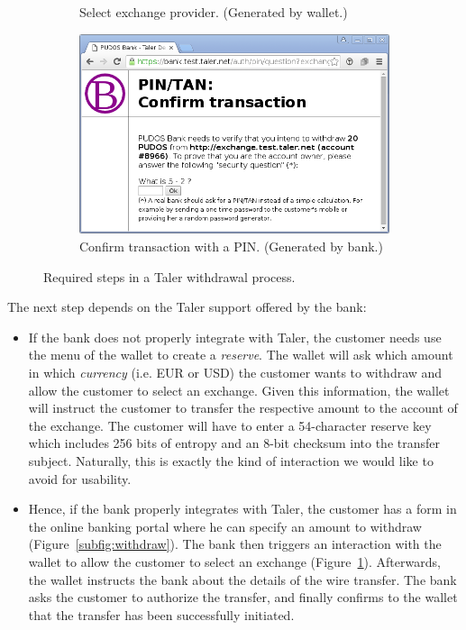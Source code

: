 \documentclass{IEEEtran}
\begin{document}
\begin{figure}
\begin{subfigure}{\linewidth}
\caption{Select exchange provider. (Generated by wallet.)}
\label{subfig:exchange}
\end{subfigure}
\begin{subfigure}{\linewidth}
\includegraphics[width=\linewidth]{figs/bank3a.png}
\caption{Confirm transaction with a PIN. (Generated by bank.)}
\label{subfig:pin}
\end{subfigure}
\caption{Required steps in a Taler withdrawal process.}
\label{fig:withdrawal}
\end{figure}


The next step depends on the Taler support offered by the bank:
\begin{itemize}
\item If the bank does not properly integrate with Taler, the
  customer needs use the menu of the wallet to create a {\em reserve}.
  The wallet will ask which amount in which {\em currency} (i.e. EUR
  or USD) the customer wants to withdraw and allow the customer to
  select an exchange.  Given this information, the wallet will
  instruct the customer to transfer the respective amount to the
  account of the exchange.  The customer will have to enter a
  54-character reserve key which includes 256 bits of entropy and an
  8-bit checksum into the transfer subject.  Naturally, this is
  exactly the kind of interaction we would like to avoid for
  usability.
\item Hence, if the bank properly integrates with Taler, the
  customer has a form in the online banking portal where he can specify
  an amount to withdraw (Figure~\ref{subfig:withdraw}).
  The bank then triggers an interaction with
  the wallet to allow the customer to select an exchange
  (Figure~\ref{subfig:exchange}).  Afterwards,
  the wallet instructs the bank about the details of the wire
  transfer.  The bank asks the customer to authorize the transfer, and
  finally confirms to the wallet that the transfer has been
  successfully initiated.
\end{itemize}
\end{document}
